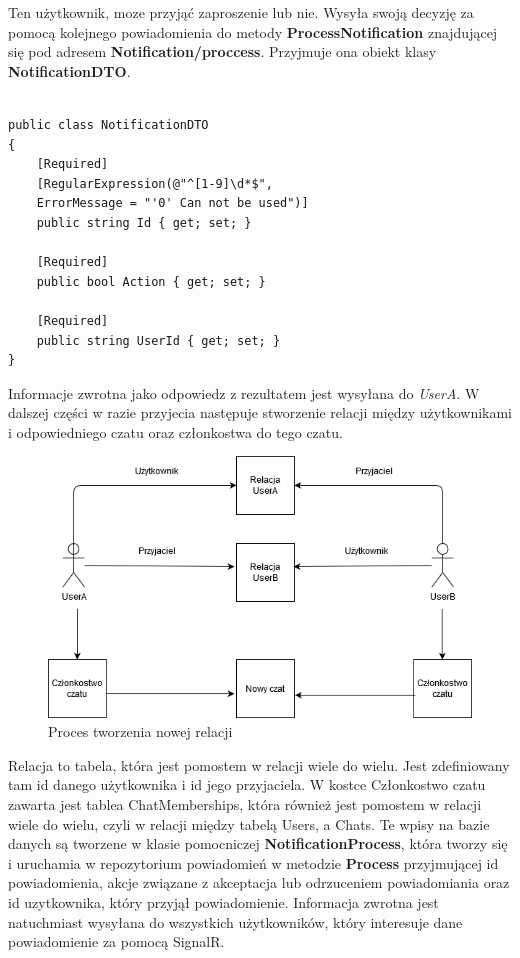 \documentclass[12pt,a4paper]{article}
\begin{document}
Ten użytkownik, moze przyjąć zaproszenie lub nie. Wysyła swoją decyzję za pomocą kolejnego powiadomienia do metody \textbf{ProcessNotification} znajdującej się pod adresem \textbf{Notification/proccess}. Przyjmuje ona obiekt klasy \textbf{NotificationDTO}.

\begin{lstlisting}[caption={Implementacja klasy NotificationDTO}]

public class NotificationDTO
{
	[Required]
	[RegularExpression(@"^[1-9]\d*$", 
	ErrorMessage = "'0' Can not be used")]
	public string Id { get; set; }
	
	[Required]
	public bool Action { get; set; }
	
	[Required]
	public string UserId { get; set; }
}
\end{lstlisting}

Informacje zwrotna jako odpowiedz z rezultatem jest wysyłana do \textit{UserA}. W dalszej części w razie przyjecia następuje stworzenie relacji między użytkownikami i odpowiedniego czatu oraz członkostwa do tego czatu.

\begin{figure}[H]
	\centering
	\includegraphics[width=0.7\linewidth]{ProcesTworzeniaNowejRelacji}
	\caption{Proces tworzenia nowej relacji}
	\label{fig:procestworzenianowejrelacji}
\end{figure}

Relacja to tabela, która jest pomostem w relacji wiele do wielu. Jest zdefiniowany tam id danego użytkownika i id jego przyjaciela. W kostce Członkostwo czatu zawarta jest tablea ChatMemberships, która również jest pomostem w relacji wiele do wielu, czyli w relacji między tabelą Users, a Chats.
\newline
Te wpisy na bazie danych są tworzene w klasie pomocniczej \textbf{NotificationProcess}, która tworzy się i uruchamia w repozytorium powiadomień w metodzie \textbf{Process} przyjmującej id powiadomienia, akcje związane z akceptacja lub odrzuceniem powiadomiania oraz id uzytkownika, który przyjął powiadomienie. Informacja zwrotna jest natuchmiast wysyłana do wszystkich użytkowników, który interesuje dane powiadomienie za pomocą SignalR.
\end{document}
